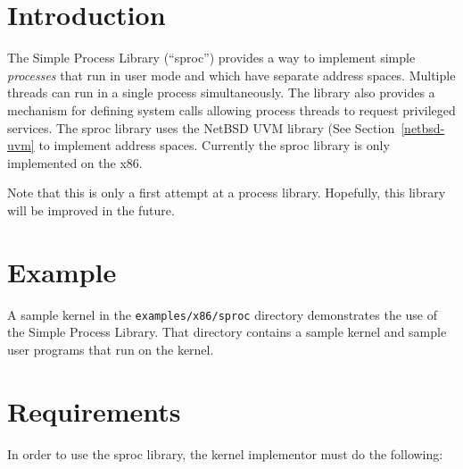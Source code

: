 %
% 
%
\label{sproc}

\section{Introduction}

The Simple Process Library (``sproc'') provides a way to implement simple
\emph{processes} that run in user mode and which have separate address spaces.
Multiple threads can run in a single process simultaneously.
The library also provides a mechanism for defining system calls allowing
process threads to request privileged services.
The sproc library uses the NetBSD UVM library (See Section~\ref{netbsd-uvm}
to implement address spaces.
Currently the sproc library is only implemented on the x86.

Note that this is only a first attempt at a process library.
Hopefully, this library will be improved in the future.

\section{Example}

A sample kernel in the \texttt{examples/x86/sproc} directory demonstrates
the use of the Simple Process Library.  That directory contains a sample
kernel and sample user programs that run on the kernel.

\section{Requirements}

In order to use the sproc library, the kernel implementor must do the
following:

